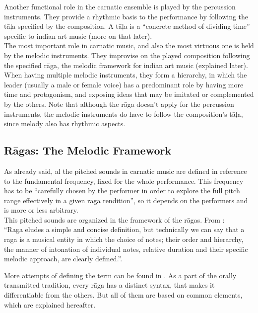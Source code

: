 Another functional role in the carnatic ensemble is played by the percussion instruments. They provide a rhythmic basis to the performance by following the t\=a\d{l}a specified by the composition. A t\=a\d{l}a is a ``concrete method of dividing time''\cite[p.63]{krishna} specific to indian art music (more on that later).\\

The most important role in carnatic music, and also the most virtuous one is held by the melodic instruments. They improvise on the played composition following the specified r\=aga, the melodic framework for indian art music (explained later). When having multiple melodic instruments, they form a hierarchy, in which the leader (usually a male or female voice) has a predominant role by having more time and protagonism, and exposing ideas that may be imitated or complemented by the others. Note that although the r\=aga doesn't apply for the percussion instruments, the melodic instruments do have to follow the composition's t\=a\d{l}a, since melody also has rhythmic aspects.

\subsection{R\=agas: The Melodic Framework}

As already said, al the pitched sounds in carnatic music are defined in reference to the fundamental frequency, fixed for the whole performance. This frequency has to be ``carefully chosen by the performer in order to explore the full pitch range effectively in a given rāga rendition''\cite[p.18]{gulati}, so it depends on the performers and is more or less arbitrary.\\

This pitched sounds are organized in the framework of the r\=agas. From \cite{indian-corpora}:\\
``Raga eludes a simple and concise definition, but technically we can say that a raga is a musical entity in which the choice of notes; their order and hierarchy, the manner of intonation of individual notes, relative duration and their specific melodic approach, are clearly defined.''.

More attempts of defining the term can be found in \cite[p.18]{gulati}. As a part of the orally transmitted tradition, every r\=aga has a distinct syntax, that makes it differentiable from the others. But all of them are based on common elements, which are explained hereafter.

